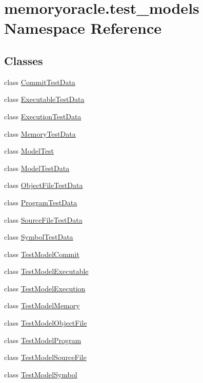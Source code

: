 \hypertarget{namespacememoryoracle_1_1test__models}{}\section{memoryoracle.\+test\+\_\+models Namespace Reference}
\label{namespacememoryoracle_1_1test__models}
\subsection*{Classes}
\begin{DoxyCompactItemize}
\item 
class \hyperlink{classmemoryoracle_1_1test__models_1_1CommitTestData}{Commit\+Test\+Data}
\item 
class \hyperlink{classmemoryoracle_1_1test__models_1_1ExecutableTestData}{Executable\+Test\+Data}
\item 
class \hyperlink{classmemoryoracle_1_1test__models_1_1ExecutionTestData}{Execution\+Test\+Data}
\item 
class \hyperlink{classmemoryoracle_1_1test__models_1_1MemoryTestData}{Memory\+Test\+Data}
\item 
class \hyperlink{classmemoryoracle_1_1test__models_1_1ModelTest}{Model\+Test}
\item 
class \hyperlink{classmemoryoracle_1_1test__models_1_1ModelTestData}{Model\+Test\+Data}
\item 
class \hyperlink{classmemoryoracle_1_1test__models_1_1ObjectFileTestData}{Object\+File\+Test\+Data}
\item 
class \hyperlink{classmemoryoracle_1_1test__models_1_1ProgramTestData}{Program\+Test\+Data}
\item 
class \hyperlink{classmemoryoracle_1_1test__models_1_1SourceFileTestData}{Source\+File\+Test\+Data}
\item 
class \hyperlink{classmemoryoracle_1_1test__models_1_1SymbolTestData}{Symbol\+Test\+Data}
\item 
class \hyperlink{classmemoryoracle_1_1test__models_1_1TestModelCommit}{Test\+Model\+Commit}
\item 
class \hyperlink{classmemoryoracle_1_1test__models_1_1TestModelExecutable}{Test\+Model\+Executable}
\item 
class \hyperlink{classmemoryoracle_1_1test__models_1_1TestModelExecution}{Test\+Model\+Execution}
\item 
class \hyperlink{classmemoryoracle_1_1test__models_1_1TestModelMemory}{Test\+Model\+Memory}
\item 
class \hyperlink{classmemoryoracle_1_1test__models_1_1TestModelObjectFile}{Test\+Model\+Object\+File}
\item 
class \hyperlink{classmemoryoracle_1_1test__models_1_1TestModelProgram}{Test\+Model\+Program}
\item 
class \hyperlink{classmemoryoracle_1_1test__models_1_1TestModelSourceFile}{Test\+Model\+Source\+File}
\item 
class \hyperlink{classmemoryoracle_1_1test__models_1_1TestModelSymbol}{Test\+Model\+Symbol}
\end{DoxyCompactItemize}
